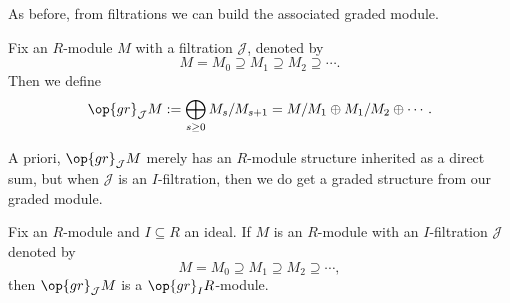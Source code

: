 As before, from filtrations we can build the associated graded module.
\begin{definition}
	Fix an $R$-module $M$ with a filtration $\mathcal J$, denoted by
	\[M=M_0\supseteq M_1\supseteq M_2\supseteq\cdots.\]
	Then we define
	\[\op{gr}_\mathcal JM:=\bigoplus_{s\ge0}M_s/M_{s+1}=M/M_1\oplus M_1/M_2\oplus\cdots.\]
\end{definition}
A priori, $\op{gr}_\mathcal JM$ merely has an $R$-module structure inherited as a direct sum, but when $\mathcal J$ is an $I$-filtration, then we do get a graded structure from our graded module.
\begin{lemma}
	Fix an $R$-module and $I\subseteq R$ an ideal. If $M$ is an $R$-module with an $I$-filtration $\mathcal J$ denoted by
	\[M=M_0\supseteq M_1\supseteq M_2\supseteq\cdots,\]
	then $\op{gr}_\mathcal JM$ is a $\op{gr}_IR$-module.
\end{lemma}
